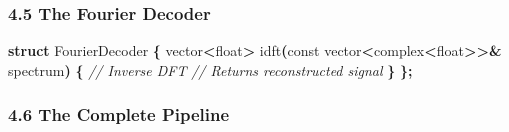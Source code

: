 \documentclass[
  11pt,
  a4paper,
]{article}
\newenvironment{Shaded}{\begin{snugshade}}{\end{snugshade}}
\newcommand{\AttributeTok}[1]{\textcolor[rgb]{0.13,0.29,0.53}{#1}}
\newcommand{\CommentTok}[1]{\textcolor[rgb]{0.56,0.35,0.01}{\textit{#1}}}
\newcommand{\DataTypeTok}[1]{\textcolor[rgb]{0.13,0.29,0.53}{#1}}
\newcommand{\KeywordTok}[1]{\textcolor[rgb]{0.13,0.29,0.53}{\textbf{#1}}}
\newcommand{\NormalTok}[1]{#1}
\newcommand{\OperatorTok}[1]{\textcolor[rgb]{0.81,0.36,0.00}{\textbf{#1}}}
\begin{document}
\subsubsection{4.5 The Fourier Decoder}\label{the-fourier-decoder}

\begin{Shaded}
\begin{Highlighting}[]
\KeywordTok{struct}\NormalTok{ FourierDecoder }\OperatorTok{\{}
\NormalTok{    vector}\OperatorTok{\textless{}}\DataTypeTok{float}\OperatorTok{\textgreater{}}\NormalTok{ idft}\OperatorTok{(}\AttributeTok{const}\NormalTok{ vector}\OperatorTok{\textless{}}\NormalTok{complex}\OperatorTok{\textless{}}\DataTypeTok{float}\OperatorTok{\textgreater{}\textgreater{}\&}\NormalTok{ spectrum}\OperatorTok{)} \OperatorTok{\{}
        \CommentTok{// Inverse DFT}
        \CommentTok{// Returns reconstructed signal}
    \OperatorTok{\}}
\OperatorTok{\};}
\end{Highlighting}
\end{Shaded}

\subsubsection{4.6 The Complete Pipeline}\label{the-complete-pipeline}
\end{document}
